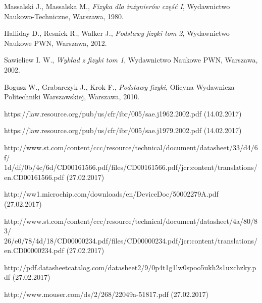 \documentclass[12pt]{article} %
\numberwithin{equation}{subsection}
\numberwithin{figure}{section}
\numberwithin{table}{section}
\begin{document}
\begin{thebibliography}{99}

		Massalski J., Massalska M., \emph{Fizyka dla inżynierów część I}, Wydawnictwo Naukowo-Techniczne, Warszawa, 1980.
	
		Halliday D., Resnick R., Walker J., \emph{Podstawy fizyki tom 2}, Wydawnictwo Naukowe PWN, Warszawa, 2012.

		Sawieliew I. W., \emph{Wykład z fizyki tom 1}, Wydawnictwo Naukowe PWN, Warszawa, 2002.
	
		Bogusz W., Grabarczyk J., Krok F., \emph{Podstawy fizyki}, Oficyna Wydawnicza Politechniki Warszawskiej, Warszawa, 2010.
		
		https://law.resource.org/pub/us/cfr/ibr/005/sae.j1962.2002.pdf (14.02.2017)
		
		https://law.resource.org/pub/us/cfr/ibr/005/sae.j1979.2002.pdf (14.02.2017)
		
		http://www.st.com/content/ccc/resource/technical/document/datasheet/33/d4/6f/
		1d/df/0b/4c/6d/CD00161566.pdf/files/CD00161566.pdf/jcr:content/translations/
		en.CD00161566.pdf (27.02.2017)
		
		http://ww1.microchip.com/downloads/en/DeviceDoc/50002279A.pdf (27.02.2017)
		
		http://www.st.com/content/ccc/resource/technical/document/datasheet/4a/80/83/
		26/e0/78/4d/18/CD00000234.pdf/files/CD00000234.pdf/jcr:content/translations/
		en.CD00000234.pdf (27.02.2017)
		
		http://pdf.datasheetcatalog.com/datasheet2/9/0p4t1g1lw0spoo5ukh2s1uxchzky.pdf (27.02.2017)
		
		http://www.mouser.com/ds/2/268/22049a-51817.pdf (27.02.2017)
		

\end{thebibliography}
	\newpage

	\listoffigures{}
	\newpage

	\listoftables
	\newpage
\end{document}

